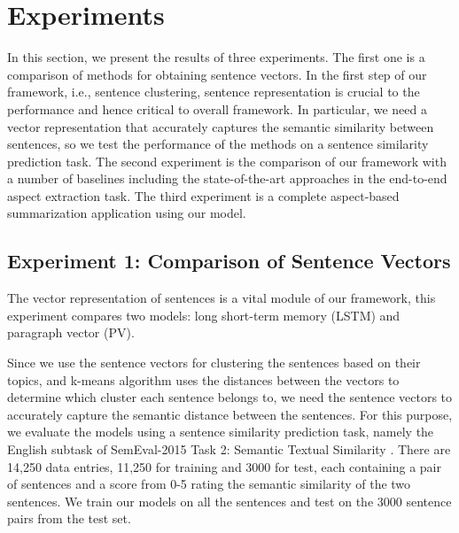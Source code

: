 \section{Experiments}
\label{sec:experiments}
%
%

In this section, we present the results of three experiments. 
The first one is a comparison of methods for obtaining sentence vectors. 
In the first step of our framework, i.e., sentence clustering, 
sentence representation is crucial to the performance 
and hence critical to overall framework. 
In particular, we need a vector representation 
that accurately captures the semantic similarity between sentences, 
so we test the performance of the methods on a sentence similarity 
prediction task. 
The second experiment is the comparison of our framework
with a number of baselines including the state-of-the-art approaches
in the end-to-end aspect extraction task.
The third experiment is a complete aspect-based summarization application using our model.

\subsection{Experiment 1: Comparison of Sentence Vectors}

The vector representation of sentences is a vital module of our framework, this experiment compares two models: long short-term memory (LSTM) and paragraph vector (PV). 

Since we use the sentence vectors for clustering the sentences based on 
their topics, and k-means algorithm uses the distances between the 
vectors to determine which cluster each sentence belongs to, 
we need the sentence vectors to accurately capture the semantic distance 
between the sentences. 
For this purpose, we evaluate the models using
a sentence similarity prediction task, namely the English subtask of 
SemEval-2015 Task 2: Semantic Textual Similarity \cite{agirrea2015semeval}.
There are 14,250 data entries, 11,250 for training and 3000 for test,
each containing a pair of sentences and a score from 0-5 rating 
the semantic similarity of the two sentences.
We train our models on all the sentences and 
test on the 3000 sentence pairs from the test set.

